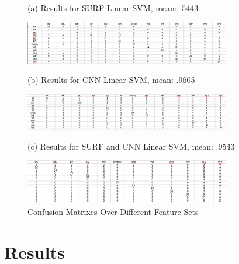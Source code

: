 \documentclass{article}
\begin{document}
\begin{figure}[htb]

\begin{minipage}[b]{1.0\linewidth}
  \centering
  \centerline{(a) Results for SURF Linear SVM, mean: .5443}\medskip
  \centerline{\includegraphics[width = 9.0cm, height = 3 cm]{firstResults}}
  \vspace{1.0cm}
\end{minipage}
\begin{minipage}[b]{1.0\linewidth}
 \centering
  \centerline{(b) Results for CNN Linear SVM, mean: .9605}\medskip
  \centerline{\includegraphics[width = 9.0cm, height = 3 cm]{secondResults}}
  \vspace{1.0cm}
\end{minipage}
\hfill
\begin{minipage}[b]{1.0\linewidth}
 \centering
  \centerline{(c) Results for SURF and CNN Linear SVM, mean: .9543}\medskip
  \centerline{\includegraphics[width = 9.0cm, height = 3 cm]{thirdResults}}
  \vspace{1.0cm}
\end{minipage}
%
\caption{Confusion Matrixes Over Different Feature Sets}
\label{fig:res}
%
\end{figure}
\section{Results}
\label{sec:pagestyle}
\end{document}

